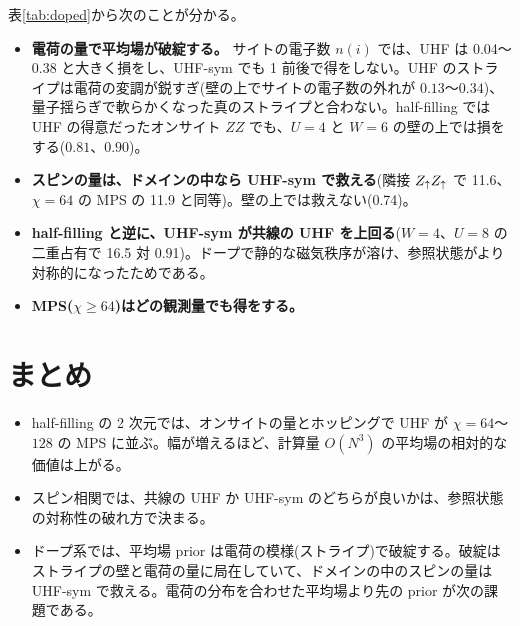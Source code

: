 表\ref{tab:doped}から次のことが分かる。
\begin{itemize}
  \item \textbf{電荷の量で平均場が破綻する。} サイトの電子数 $n(i)$ では、UHF は 0.04〜0.38 と大きく損をし、UHF-sym でも 1 前後で得をしない。UHF のストライプは電荷の変調が鋭すぎ(壁の上でサイトの電子数の外れが $0.13$〜$0.34$)、量子揺らぎで軟らかくなった真のストライプと合わない。half-filling では UHF の得意だったオンサイト $ZZ$ でも、$U=4$ と $W=6$ の壁の上では損をする($0.81$、$0.90$)。
  \item \textbf{スピンの量は、ドメインの中なら UHF-sym で救える}(隣接 $Z_\uparrow Z_\uparrow$ で 11.6、$\chi=64$ の MPS の 11.9 と同等)。壁の上では救えない(0.74)。
  \item \textbf{half-filling と逆に、UHF-sym が共線の UHF を上回る}($W=4$、$U=8$ の二重占有で 16.5 対 0.91)。ドープで静的な磁気秩序が溶け、参照状態がより対称的になったためである。
  \item \textbf{MPS($\chi\ge64$)はどの観測量でも得をする。}
\end{itemize}

\section{まとめ}
\begin{itemize}
  \item half-filling の 2 次元では、オンサイトの量とホッピングで UHF が $\chi=64$〜$128$ の MPS に並ぶ。幅が増えるほど、計算量 $O(N^3)$ の平均場の相対的な価値は上がる。
  \item スピン相関では、共線の UHF か UHF-sym のどちらが良いかは、参照状態の対称性の破れ方で決まる。
  \item ドープ系では、平均場 prior は電荷の模様(ストライプ)で破綻する。破綻はストライプの壁と電荷の量に局在していて、ドメインの中のスピンの量は UHF-sym で救える。電荷の分布を合わせた平均場より先の prior が次の課題である。
\end{itemize}
